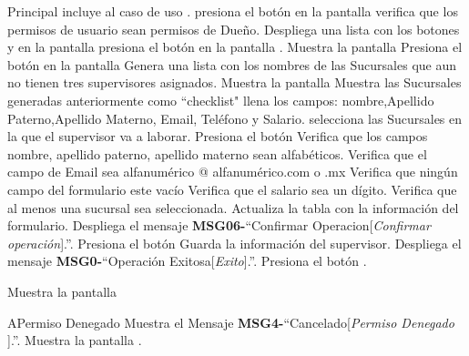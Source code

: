 	\begin{UCtrayectoria}{Principal}
		\UCpaso incluye al caso de uso .
		\UCpaso [\UCactor] presiona el botón  en la pantalla 
		\UCpaso verifica que los permisos de usuario sean permisos de Dueño. 
		\UCpaso Despliega una lista con los botones  y 
		 en la pantalla 
		\UCpaso [\UCactor] presiona el botón  en la pantalla .
		\UCpaso Muestra la pantalla 
		\UCpaso [\UCactor] Presiona el botón  en la pantalla 
		\UCpaso Genera una lista con los nombres de las Sucursales que aun no tienen tres supervisores asignados.
		\UCpaso Muestra la pantalla 
		\UCpaso Muestra las Sucursales generadas anteriormente como ``checklist"
		\UCpaso [\UCactor] llena los campos: nombre,Apellido Paterno,Apellido Materno, Email, Teléfono y Salario.
		\UCpaso [\UCactor] selecciona las Sucursales en la que el supervisor va a laborar.
		\UCpaso [\UCactor] Presiona el botón 
		\UCpaso Verifica que los campos nombre, apellido paterno, apellido materno
		sean alfabéticos.
		\UCpaso Verifica que el campo de Email sea alfanumérico @ alfanumérico.com o .mx 
		\UCpaso Verifica que ningún campo del formulario este vacío 
		\UCpaso Verifica que el salario sea un dígito.
		\UCpaso Verifica que al menos una sucursal sea seleccionada.
		\UCpaso Actualiza la tabla  con  la información del formulario.
		\UCpaso Despliega el mensaje {\bf MSG06-}``Confirmar Operacion[{\em Confirmar operación}].''.
		\UCpaso [\UCactor] Presiona el botón 
		\UCpaso Guarda la información del supervisor.
		\UCpaso Despliega el mensaje {\bf MSG0-}``Operación Exitosa[{\em Exito}].''.
		\UCpaso [\UCactor] Presiona el botón .

		\UCpaso Muestra la pantalla  
	\end{UCtrayectoria}
	\begin{UCtrayectoriaA}{A}{Permiso Denegado}
			\UCpaso Muestra el Mensaje {\bf MSG4-}``Cancelado[{\em Permiso Denegado }].''.
			\UCpaso Muestra la pantalla .
		\end{UCtrayectoriaA}

